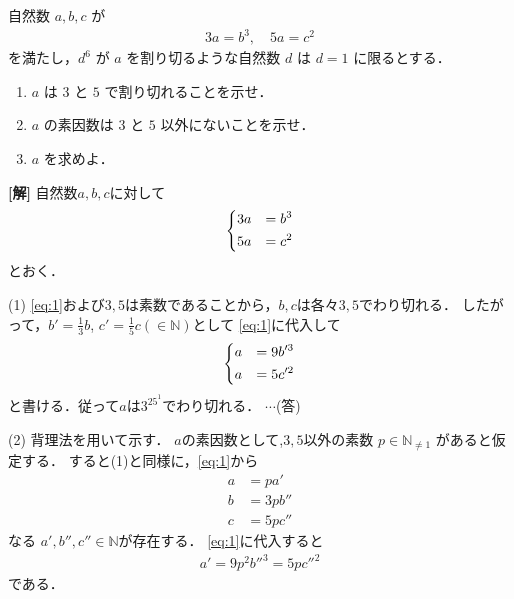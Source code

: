 \documentclass[a4paper,10pt]{ltjsarticle}
\begin{document}
\begin{oframed}
  自然数 $a, b, c$ が
  \begin{align*}
    3a = b^3, \quad 5a = c^2
  \end{align*}
  を満たし，$d^6$ が $a$ を割り切るような自然数 $d$ は $d=1$ に限るとする．

  \begin{enumerate}
    \item $a$ は $3$ と $5$ で割り切れることを示せ．
    \item $a$ の素因数は $3$ と $5$ 以外にないことを示せ．
    \item $a$ を求めよ．
  \end{enumerate}
\end{oframed}


\setlength{\columnseprule}{0.4pt}
\begin{multicols}{2}
  {\bf[解]}
  自然数$a,b,c$に対して
  \begin{align}
    \begin{dcases}
      3a & =b^3 \\
      5a & =c^2
    \end{dcases}\label{eq:1}
  \end{align}
  とおく．

  \vspace{10pt}
  (1)
  \cref{eq:1}および$3,5$は素数であることから，$b,c$は各々$3,5$でわり切れる．
  したがって，$b'=\frac{1}{3}b$, $c'=\frac{1}{5}c ( \in \mathbb{N} )$として
  \cref{eq:1}に代入して
  \begin{align}
    \begin{dcases}
      a & =9b'^3 \\
      a & =5c'^2
    \end{dcases} \label{eq:2}
  \end{align}
  と書ける．従って$a$は$3^25^1$でわり切れる． $\cdots$(答)

  \vspace{10pt}
  (2)
  背理法を用いて示す．
  $a$の素因数として,$3,5$以外の素数 $p \in \mathbb{N}_{\ne 1}$ があると仮定する．
  すると(1)と同様に，\cref{eq:1}から
  \begin{align*}
    a & =p a'   \\
    b & =3p b'' \\
    c & =5p c''
  \end{align*}
  なる $a',b'',c'' \in \mathbb{N}$が存在する．
  \cref{eq:1}に代入すると
  \begin{align}
    a'=9p^2b''^3 = 5pc''^2 \label{eq:3}
  \end{align}
  である．


\end{multicols}
\end{document}
